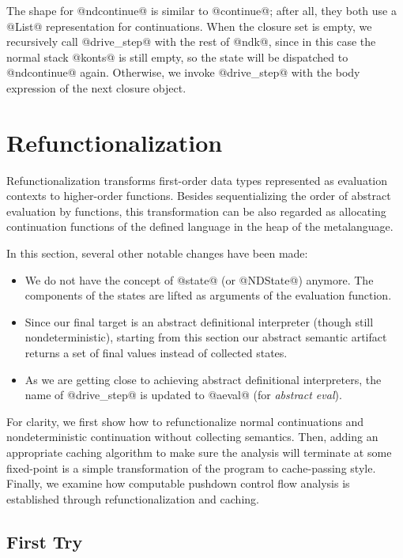 \documentclass[acmsmall,review,anonymous]{acmart}\settopmatter{printfolios=true,printccs=false,printacmref=false}
\begin{document}
The shape for @ndcontinue@ is similar to @continue@; after
all, they both use a @List@ representation for continuations.
When the closure set is empty, we recursively call @drive_step@ with the rest
of @ndk@, since in this case the normal stack @konts@ is still empty, so
the state will be dispatched to @ndcontinue@ again.
Otherwise, we invoke @drive_step@ with the body expression of the next closure object.

\section{Refunctionalization} \label{refunc}

Refunctionalization transforms first-order data types represented as 
evaluation contexts to higher-order functions.
Besides sequentializing the order of abstract evaluation by functions,
this transformation can be also regarded as allocating continuation functions of
the defined language in the heap of the metalanguage.

In this section, several other notable changes have been made:
\begin{itemize}
\item We do not have the concept of @state@ (or @NDState@) anymore.
The components of the states are lifted as arguments of the evaluation
function.
\item Since our final target is an abstract definitional interpreter (though still
nondeterministic), starting from this section our abstract semantic artifact
returns a set of final values instead of collected states.
\item As we are getting close to achieving
abstract definitional interpreters, the name of @drive_step@ is updated to
@aeval@ (for \emph{abstract eval}).
\end{itemize}

For clarity, we first show how to refunctionalize normal continuations and
nondeterministic continuation without collecting semantics.
Then, adding an appropriate caching algorithm to make sure the analysis will
terminate at some fixed-point is a simple transformation of the program to cache-passing
style. Finally, we examine how computable pushdown control flow analysis is established
through refunctionalization and caching.

\subsection{First Try}
\end{document}
